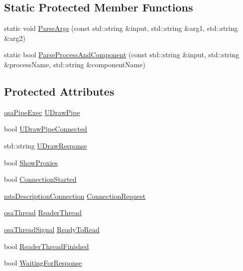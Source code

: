 \subsection*{Static Protected Member Functions}
\begin{DoxyCompactItemize}
\item 
static void \hyperlink{classmts_component_viewer_a514501a010d6f9cde03032d7853cde39}{Parse\+Args} (const std\+::string \&input, std\+::string \&arg1, std\+::string \&arg2)
\item 
static bool \hyperlink{classmts_component_viewer_aaaa3f74701e2fc95e7a26939dccee4b1}{Parse\+Process\+And\+Component} (const std\+::string \&input, std\+::string \&process\+Name, std\+::string \&component\+Name)
\end{DoxyCompactItemize}
\subsection*{Protected Attributes}
\begin{DoxyCompactItemize}
\item 
\hyperlink{classosa_pipe_exec}{osa\+Pipe\+Exec} \hyperlink{classmts_component_viewer_a4f2747dc20890be285fa6b031516c6dc}{U\+Draw\+Pipe}
\item 
bool \hyperlink{classmts_component_viewer_a7590f5f827427231d8fe2bd813feb22e}{U\+Draw\+Pipe\+Connected}
\item 
std\+::string \hyperlink{classmts_component_viewer_acae080559e0ab6cbb24070743348d9aa}{U\+Draw\+Response}
\item 
bool \hyperlink{classmts_component_viewer_a3e3249972f2cd16f18ea84aa0df92218}{Show\+Proxies}
\item 
bool \hyperlink{classmts_component_viewer_aa6617f20137e55bf8fe983d8587a22d2}{Connection\+Started}
\item 
\hyperlink{classmts_description_connection}{mts\+Description\+Connection} \hyperlink{classmts_component_viewer_ab4e2905d1679386f9a8d15d0bcaaf996}{Connection\+Request}
\item 
\hyperlink{classosa_thread}{osa\+Thread} \hyperlink{classmts_component_viewer_a5b608706d9dec221cd4ca599a165fec7}{Reader\+Thread}
\item 
\hyperlink{classosa_thread_signal}{osa\+Thread\+Signal} \hyperlink{classmts_component_viewer_a2b172a1000cad46b886f92073ca3a650}{Ready\+To\+Read}
\item 
bool \hyperlink{classmts_component_viewer_ab5cfa733f00890d5ee7ef44eac6624cf}{Reader\+Thread\+Finished}
\item 
bool \hyperlink{classmts_component_viewer_ad0d7132119ce154a8e7b646153ae0cc0}{Waiting\+For\+Response}
\end{DoxyCompactItemize}
